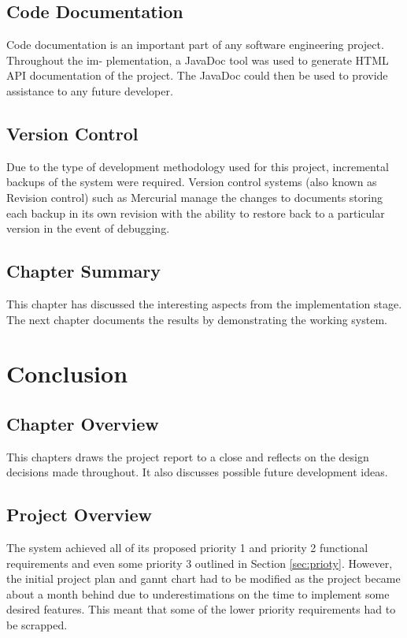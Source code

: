 \documentclass[12pt,a4paper]{article}
\newcommand\tab[1][1cm]{\hspace*{#1}}
\begin{document}
	\subsection{Code Documentation}
	\tab Code documentation is an important part of any software engineering project. Throughout the im-
plementation, a JavaDoc tool was used to generate HTML API documentation of the project. The
JavaDoc could then be used to provide assistance to any future developer.

	\subsection{Version Control}
	\tab Due to the type of development methodology used for this project, incremental backups of the system
were required. Version control systems (also known as Revision control) such as Mercurial manage
the changes to documents storing each backup in its own revision with the ability to restore back to a
particular version in the event of debugging.
	
		

	\subsection{Chapter Summary}
	\tab This chapter has discussed the interesting aspects from the implementation stage. The next chapter
documents the results by demonstrating the working system.
	
	\newpage	
	\section{Conclusion}
	\subsection{Chapter Overview}
		\tab This chapters draws the project report to a close and reflects on the design decisions made throughout.
It also discusses possible future development ideas.

	\subsection{Project Overview}
	\tab The system achieved all of its proposed priority 1 and priority 2 functional requirements and even some
priority 3 outlined in Section \ref{sec:prioty}.
However, the initial project plan and gannt chart had to be modified as the project became about
a month behind due to underestimations on the time to implement some desired features. This meant
that some of the lower priority requirements had to be scrapped.
\end{document}
